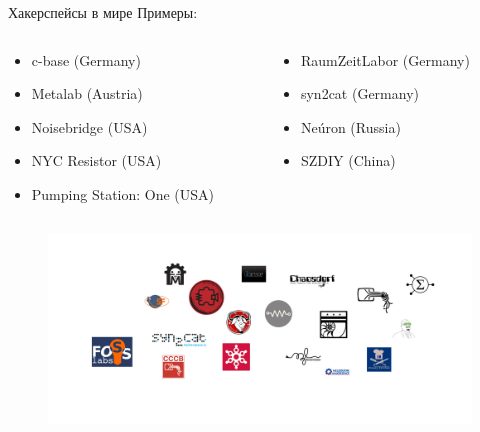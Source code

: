 \documentclass[presentation]{beamer}
\begin{document}
\begin{frame}[label=1-3-2]{Хакерспейсы в мире}
  Примеры:
  \begin{columns}
    \begin{column}{0.5\textwidth}
      \begin{itemize}
      \item c-base (Germany)
      \item Metalab (Austria)
      \item Noisebridge (USA)
      \item NYC Resistor (USA)
      \item Pumping Station: One (USA)
      \end{itemize}
    \end{column}
    \begin{column}{0.5\textwidth}
      \begin{itemize}
      \item RaumZeitLabor (Germany)
      \item syn2cat (Germany)
      \item Neúron (Russia)
      \item SZDIY (China)
      \end{itemize}
    \end{column}
  \end{columns}
  \begin{figure}[htb]
    \centering
    \includegraphics[width=.9\linewidth]{hackerspace-logos}
  \end{figure}
\end{frame}
\end{document}
